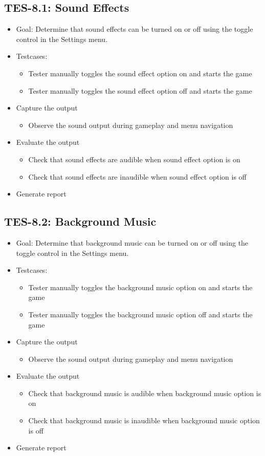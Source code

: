 \subsection{TES-8.1: Sound Effects}
\begin{itemize}
\item Goal: Determine that sound effects can be turned on or off using the 
toggle control in the Settings menu.
\item Testcases: 
\begin{itemize}
\item Tester manually toggles the sound effect option on and starts the game
\item Tester manually toggles the sound effect option off and starts the game
\end{itemize}
\item Capture the output 
\begin{itemize}
\item Observe the sound output during gameplay and menu navigation
\end{itemize}
\item Evaluate the output 
\begin{itemize}
\item Check that sound effects are audible when sound effect option is on
\item Check that sound effects are inaudible when sound effect option is off
\end{itemize}
\item Generate report 
\end{itemize}

\subsection{TES-8.2: Background Music}
\begin{itemize}
\item Goal: Determine that background music can be turned on or off using the 
toggle control in the Settings menu.
\item Testcases: 
\begin{itemize}
\item Tester manually toggles the background music option on and starts the game
\item Tester manually toggles the background music option off and starts the game
\end{itemize}
\item Capture the output 
\begin{itemize}
\item Observe the sound output during gameplay and menu navigation
\end{itemize}
\item Evaluate the output 
\begin{itemize}
\item Check that background music is audible when background music option is on
\item Check that background music is inaudible when background music option is off
\end{itemize}
\item Generate report 
\end{itemize}

